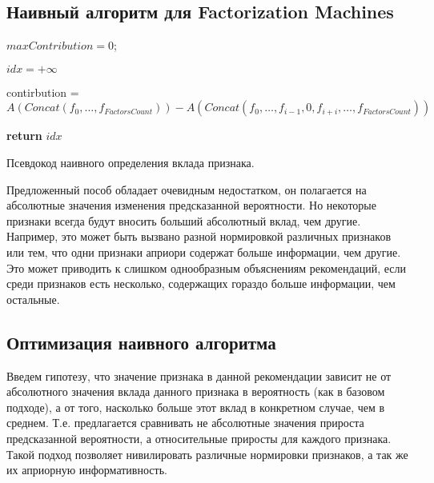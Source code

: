 \documentclass[12pt,a4paper]{report}
\begin{document}
\subsection{Наивный алгоритм для Factorization Machines}

\begin{algorithm}[H]
\SetAlgoLined
{}

$maxContribution = 0$;

$idx = +\infty$

 {

contirbution = $A(Concat(f_0, \dots, f_{FactorsCount})) - A(Concat(f_0, \dots, f_{i-1}, 0, f_{i+i}, \dots, f_{FactorsCount}))$

}

\textbf{return} $idx$
\caption{Псевдокод наивного определения вклада признака.}
\label{alg:naiveAI}
\end{algorithm}

Предложенный пособ обладает очевидным недостатком, он полагается на абсолютные значения изменения предсказанной вероятности. Но некоторые признаки всегда будут вносить больший абсолютный вклад, чем другие. Например, это может быть вызвано разной нормировкой различных признаков или тем, что одни признаки априори содержат больше информации, чем другие. Это может приводить к слишком однообразным объяснениям рекомендаций, если среди признаков есть несколько, содержащих гораздо больше информации, чем остальные.
\subsection{Оптимизация наивного алгоритма}
Введем гипотезу, что значение признака в данной рекомендации зависит не от абсолютного значения вклада данного признака в вероятность (как в базовом подходе), а от того, насколько больше этот вклад в конкретном случае, чем в среднем. Т.е. предлагается сравнивать не абсолютные значения прироста предсказанной вероятности, а относительные приросты для каждого признака. Такой подход позволяет нивилировать различные нормировки признаков, а так же их априорную информативность.
\end{document}
